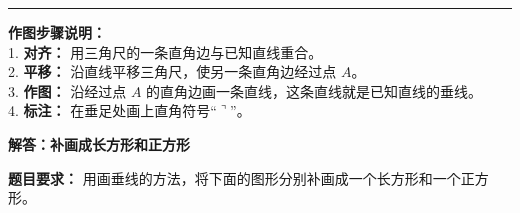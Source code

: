 \vspace{1.0cm}
\hrule
\vspace{0.4cm}

{\small
\textbf{作图步骤说明：} \\
1. \textbf{对齐：} 用三角尺的一条直角边与已知直线重合。 \\
2. \textbf{平移：} 沿直线平移三角尺，使另一条直角边经过点 $A$。 \\
3. \textbf{作图：} 沿经过点 $A$ 的直角边画一条直线，这条直线就是已知直线的垂线。 \\
4. \textbf{标注：} 在垂足处画上直角符号“$\urcorner$”。
}




\newpage

\begin{center}
  {\large\bfseries 解答：补画成长方形和正方形}
\end{center}

\vspace{0.6cm}

\noindent
{\small \textbf{题目要求：} 用画垂线的方法，将下面的图形分别补画成一个长方形和一个正方形。}

\vspace{0.8cm}

